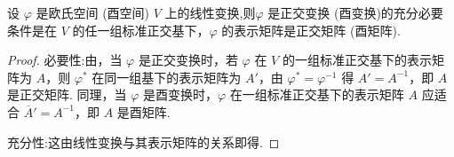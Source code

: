 \documentclass[../../main.tex]{subfiles}%
\begin{document}
\begin{theorem}\label{theorem:正交变换和酉变换关于表示矩阵的充要条件}
设 $\varphi$ 是欧氏空间 (酉空间) $V$ 上的线性变换,则$\varphi$ 是正交变换 (酉变换)的充分必要条件是在 $V$ 的任一组标准正交基下，$\varphi$ 的表示矩阵是正交矩阵 (酉矩阵).
\end{theorem}
\begin{proof}

必要性:由，当 $\varphi$ 是正交变换时，若 $\varphi$ 在 $V$ 的一组标准正交基下的表示矩阵为 $A$，则 $\varphi^*$ 在同一组基下的表示矩阵为 $A'$，由 $\varphi^* = \varphi^{-1}$ 得 $A' = A^{-1}$，即 $A$ 是正交矩阵. 同理，当 $\varphi$ 是酉变换时，$\varphi$ 在一组标准正交基下的表示矩阵 $A$ 应适合 $\overline{A}' = A^{-1}$，即 $A$ 是酉矩阵.

充分性:这由线性变换与其表示矩阵的关系即得.

\end{proof}
\end{document}
